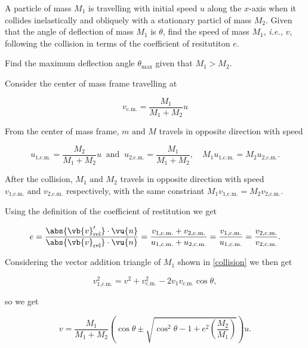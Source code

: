 {A particle of mass \(M_1 \) is travelling with initial speed \(u\) along the \(x\)-axis when it collides inelastically and obliquely with a stationary particl of mass \(M_2 \). Given that the angle of deflection of mass \(M_1 \) is \(\theta\), find the speed of mass \(M_1 \), \textit{i.e.,} \(v\), following the collision in terms of the coefficient of resitutiton \(e\).

Find the maximum deflection angle \(\theta _{\text{max} } \) given that \(M_1 > M_2 \).  }
{Consider the center of mass frame travelling at 

\begin{equation}
	v_{\text{c.m.} } = \frac{M_1 }{M_1 + M_2 }u  
\end{equation}

From the center of mass frame, \(m \text { and } M\) travels in opposite direction with speed 

\begin{equation}
	u_{\text{1,c.m.} } = \frac{M_2 }{M_1 + M_2 } u ~\text { and }~ u_{\text{2,c.m.} } = \frac{M_1 }{M_1 + M_2 }, \quad M_1 u_{\text{1,c.m.} } = M_2 u_{\text{2,c.m.} }.  
\end{equation}

After the collision, \(M_1  \text { and } M_2 \) travels in opposite direction with speed \(v_{\text{1,c.m.} } \text { and } v_{\text{2,c.m.} }  \) respectively, with the same constriant \(M_1 v_{\text{1,c.m.} }  = M_2 v_{\text{2,c.m.} } \).  

Using the definition of the coefficient of restitution we get 

\begin{equation}
	e = \frac{\abs{\vb{v} _{\text{rel} } '} \cdot \vu{n} }{\abs{\vb{v} _{\text{rel} } } \cdot \vu{n} } = \frac{v_{\text{1,c.m.} } + v_{\text{2,c.m.} }  }{u_{\text{1,c.m.} } + u_{\text{2,c.m.} } } = \frac{v_{\text{1,c.m.} } }{u_{\text{1,c.m.} } } = \frac{v_{\text{2,c.m.} } }{v_{\text{2,c.m.} } }.    
\end{equation}

Considering the vector addition triangle of \(M_1 \) shown in \cref{collision} we then get 

\begin{equation}
	v_{\text{1,c.m.} }^2 = v ^2 + v_{\text{c.m.} }^2 - 2v_1 v_{\text{c.m.} } \cos \theta , 
\end{equation}

so we get 

\begin{equation}
	v = \frac{M_1 }{M_1 + M_2 } \left( \cos \theta \pm \sqrt{\cos ^2\theta - 1 + e^2 \left( \frac{M_2 }{M_1 }  \right)}  \right) u.
\end{equation}


}
